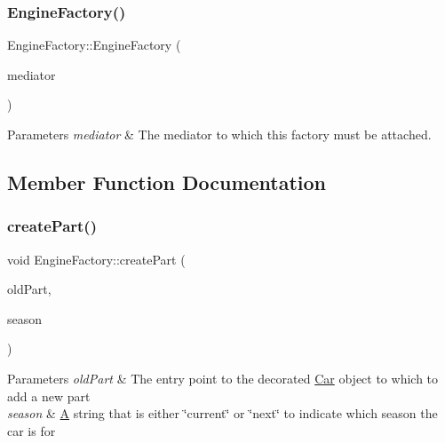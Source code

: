 \subsubsection{\texorpdfstring{Engine\+Factory()}{EngineFactory()}}
{\footnotesize\ttfamily Engine\+Factory\+::\+Engine\+Factory (\begin{DoxyParamCaption}\item[{\hyperlink{classDepartmentMediator}{Department\+Mediator} $\ast$}]{mediator }\end{DoxyParamCaption})}


\begin{DoxyParams}{Parameters}
{\em mediator} & The mediator to which this factory must be attached. \\
\hline
\end{DoxyParams}


\subsection{Member Function Documentation}
\mbox{\label{classEngineFactory_af8c2f4bf420b5d2f0742b3d38746cf40}} 
\subsubsection{\texorpdfstring{create\+Part()}{createPart()}}
{\footnotesize\ttfamily void Engine\+Factory\+::create\+Part (\begin{DoxyParamCaption}\item[{\hyperlink{classDepartmentOutput}{Department\+Output} $\ast$}]{old\+Part,  }\item[{string}]{season }\end{DoxyParamCaption})\hspace{0.3cm}{\ttfamily [virtual]}}


\begin{DoxyParams}{Parameters}
{\em old\+Part} & The entry point to the decorated \hyperlink{classCar}{Car} object to which to add a new part \\
\hline
{\em season} & \hyperlink{classA}{A} string that is either \char`\"{}current\char`\"{} or \char`\"{}next\char`\"{} to indicate which season the car is for \\
\hline
\end{DoxyParams}



